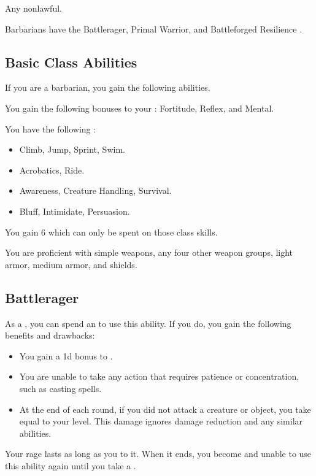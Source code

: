      Any nonlawful.

     Barbarians have the Battlerager, Primal Warrior, and Battleforged Resilience .

    \subsection{Basic Class Abilities}
        If you are a barbarian, you gain the following abilities.

        You gain the following bonuses to your :  Fortitude,  Reflex, and  Mental.

        You have the following :
        \begin{itemize}
            \item {} Climb, Jump, Sprint, Swim.
            \item {} Acrobatics, Ride.
            \item {} Awareness, Creature Handling, Survival.
            \item {} Bluff, Intimidate, Persuasion.
        \end{itemize}
        You gain 6  which can only be spent on those class skills.

        You are proficient with simple weapons, any four other weapon groups, light armor, medium armor, and shields.

    \subsection{Battlerager}\label{Rage}

        As a , you can spend an  to use this ability.
        If you do, you gain the following benefits and drawbacks:
        \begin{itemize}
            \item You gain a \plus1d bonus to .
            \item You are unable to take any action that requires patience or concentration, such as casting spells.
            \item At the end of each round, if you did not attack a creature or object, you take  equal to your level.
                This damage ignores damage reduction and any similar abilities.
        \end{itemize}
        Your rage lasts as long as you  to it.
        When it ends, you become \fatigued and unable to use this ability again until you take a .

